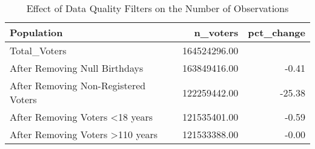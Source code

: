 \begin{table}[!htb]
\centering
\caption{Effect of Data Quality Filters on the Number of Observations} 
\label{table:filter}
\begingroup\small
\begin{tabular}{lrr}
  \hline
Population & n_voters & pct_change \\ 
  \hline
Total_Voters & 164524296.00 &  \\ 
  After Removing Null Birthdays & 163849416.00 & -0.41 \\ 
  After Removing Non-Registered Voters & 122259442.00 & -25.38 \\ 
  After Removing Voters <18 years & 121535401.00 & -0.59 \\ 
  After Removing Voters >110 years & 121533388.00 & -0.00 \\ 
   \hline
\end{tabular}
\endgroup
\end{table}
